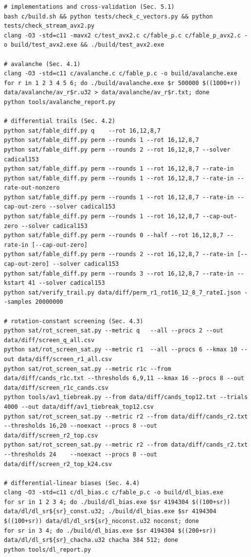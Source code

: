 \documentclass{iacrtrans}
\begin{document}
\begin{lstlisting}[basicstyle=\ttfamily\footnotesize,breaklines=true]
# implementations and cross-validation (Sec. 5.1)
bash c/build.sh && python tests/check_c_vectors.py && python tests/check_stream_avx2.py
clang -O3 -std=c11 -mavx2 c/test_avx2.c c/fable_p.c c/fable_p_avx2.c -o build/test_avx2.exe && ./build/test_avx2.exe

# avalanche (Sec. 4.1)
clang -O3 -std=c11 c/avalanche.c c/fable_p.c -o build/avalanche.exe
for r in 1 2 3 4 5 6; do ./build/avalanche.exe $r 500000 $((1000+r)) data/avalanche/av_r$r.u32 > data/avalanche/av_r$r.txt; done
python tools/avalanche_report.py

# differential trails (Sec. 4.2)
python sat/fable_diff.py q    --rot 16,12,8,7
python sat/fable_diff.py perm --rounds 1 --rot 16,12,8,7
python sat/fable_diff.py perm --rounds 2 --rot 16,12,8,7 --solver cadical153
python sat/fable_diff.py perm --rounds 1 --rot 16,12,8,7 --rate-in
python sat/fable_diff.py perm --rounds 1 --rot 16,12,8,7 --rate-in --rate-out-nonzero
python sat/fable_diff.py perm --rounds 1 --rot 16,12,8,7 --rate-in --cap-out-zero --solver cadical153
python sat/fable_diff.py perm --rounds 1 --rot 16,12,8,7 --cap-out-zero --solver cadical153
python sat/fable_diff.py perm --rounds 0 --half --rot 16,12,8,7 --rate-in [--cap-out-zero]
python sat/fable_diff.py perm --rounds 2 --rot 16,12,8,7 --rate-in [--cap-out-zero] --solver cadical153
python sat/fable_diff.py perm --rounds 3 --rot 16,12,8,7 --rate-in --kstart 41 --solver cadical153
python sat/verify_trail.py data/diff/perm_r1_rot16_12_8_7_rateI.json --samples 20000000

# rotation-constant screening (Sec. 4.3)
python sat/rot_screen_sat.py --metric q   --all --procs 2 --out data/diff/screen_q_all.csv
python sat/rot_screen_sat.py --metric r1  --all --procs 6 --kmax 10 --out data/diff/screen_r1_all.csv
python sat/rot_screen_sat.py --metric r1c --from data/diff/cands_r1c.txt --thresholds 6,9,11 --kmax 16 --procs 8 --out data/diff/screen_r1c_cands.csv
python tools/av1_tiebreak.py --from data/diff/cands_top12.txt --trials 4000 --out data/diff/av1_tiebreak_top12.csv
python sat/rot_screen_sat.py --metric r2 --from data/diff/cands_r2.txt --thresholds 16,20 --noexact --procs 8 --out data/diff/screen_r2_top.csv
python sat/rot_screen_sat.py --metric r2 --from data/diff/cands_r2.txt --thresholds 24    --noexact --procs 8 --out data/diff/screen_r2_top_k24.csv

# differential-linear biases (Sec. 4.4)
clang -O3 -std=c11 c/dl_bias.c c/fable_p.c -o build/dl_bias.exe
for sr in 1 2 3 4; do ./build/dl_bias.exe $sr 4194304 $((100+sr)) data/dl/dl_sr${sr}_const.u32; ./build/dl_bias.exe $sr 4194304 $((100+sr)) data/dl/dl_sr${sr}_noconst.u32 noconst; done
for sr in 3 4; do ./build/dl_bias.exe $sr 4194304 $((200+sr)) data/dl/dl_sr${sr}_chacha.u32 chacha 384 512; done
python tools/dl_report.py


\end{lstlisting}
\end{document}
